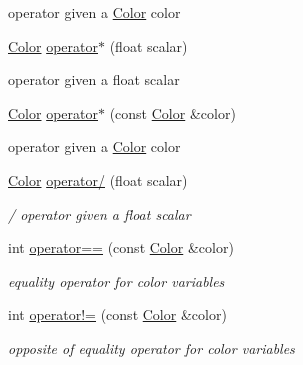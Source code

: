 \begin{DoxyCompactItemize}
\begin{DoxyCompactList}\small\item\em 
\begin{DoxyItemize}
\item operator given a \hyperlink{classColor}{Color} color 
\end{DoxyItemize}\end{DoxyCompactList}\item 
\mbox{\label{classColor_a1e5aa9e5811e7711ebfe997fa8b7accd}} 
\hyperlink{classColor}{Color} \hyperlink{classColor_a1e5aa9e5811e7711ebfe997fa8b7accd}{operator$\ast$} (float scalar)
\begin{DoxyCompactList}\small\item\em 
\begin{DoxyItemize}
\item operator given a float scalar 
\end{DoxyItemize}\end{DoxyCompactList}\item 
\mbox{\label{classColor_abd8c55279f5b9442ee149c7d670f32ad}} 
\hyperlink{classColor}{Color} \hyperlink{classColor_abd8c55279f5b9442ee149c7d670f32ad}{operator$\ast$} (const \hyperlink{classColor}{Color} \&color)
\begin{DoxyCompactList}\small\item\em 
\begin{DoxyItemize}
\item operator given a \hyperlink{classColor}{Color} color 
\end{DoxyItemize}\end{DoxyCompactList}\item 
\mbox{\label{classColor_a7ef1308bd6371f7816607fd7f00c4ed2}} 
\hyperlink{classColor}{Color} \hyperlink{classColor_a7ef1308bd6371f7816607fd7f00c4ed2}{operator/} (float scalar)
\begin{DoxyCompactList}\small\item\em / operator given a float scalar \end{DoxyCompactList}\item 
\mbox{\label{classColor_a493d3257d936fd306de590de1d7a0b21}} 
int \hyperlink{classColor_a493d3257d936fd306de590de1d7a0b21}{operator==} (const \hyperlink{classColor}{Color} \&color)
\begin{DoxyCompactList}\small\item\em equality operator for color variables \end{DoxyCompactList}\item 
\mbox{\label{classColor_af896082b138401e97e14bc72d6ef6285}} 
int \hyperlink{classColor_af896082b138401e97e14bc72d6ef6285}{operator!=} (const \hyperlink{classColor}{Color} \&color)
\begin{DoxyCompactList}\small\item\em opposite of equality operator for color variables \end{DoxyCompactList}\end{DoxyCompactItemize}
